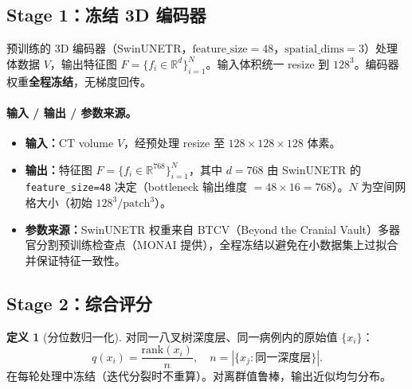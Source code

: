 \documentclass[11pt,a4paper]{article}
\newcommand{\RR}{\mathbb{R}}
\theoremstyle{definition}
\newtheorem{definition}{定义}[section]
\begin{document}
\subsection{Stage 1：冻结 3D 编码器}

预训练的 3D 编码器（SwinUNETR，$\mathrm{feature\_size}=48$，$\mathrm{spatial\_dims}=3$）处理体数据 $V$，输出特征图 $F = \{f_i \in \RR^d\}_{i=1}^{N}$。输入体积统一 resize 到 $128^3$。编码器权重\textbf{全程冻结}，无梯度回传。

\paragraph{输入 / 输出 / 参数来源。}
\begin{itemize}[nosep]
    \item \textbf{输入：}CT volume $V$，经预处理 resize 至 $128 \times 128 \times 128$ 体素。
    \item \textbf{输出：}特征图 $F = \{f_i \in \RR^{768}\}_{i=1}^{N}$，其中 $d=768$ 由 SwinUNETR 的 \texttt{feature\_size=48} 决定（bottleneck 输出维度 $= 48 \times 16 = 768$）。$N$ 为空间网格大小（初始 $128^3 / \text{patch}^3$）。
    \item \textbf{参数来源：}SwinUNETR 权重来自 BTCV（Beyond the Cranial Vault）多器官分割预训练检查点（MONAI 提供），全程冻结以避免在小数据集上过拟合并保证特征一致性。
\end{itemize}


\subsection{Stage 2：综合评分}

\begin{definition}[分位数归一化]
对同一八叉树深度层、同一病例内的原始值 $\{x_i\}$：
\begin{equation}
q(x_i) = \frac{\mathrm{rank}(x_i)}{n}, \quad n = |\{x_j : \text{同一深度层}\}|.
\end{equation}
在每轮处理中冻结（迭代分裂时不重算）。对离群值鲁棒，输出近似均匀分布。
\end{definition}
\end{document}

